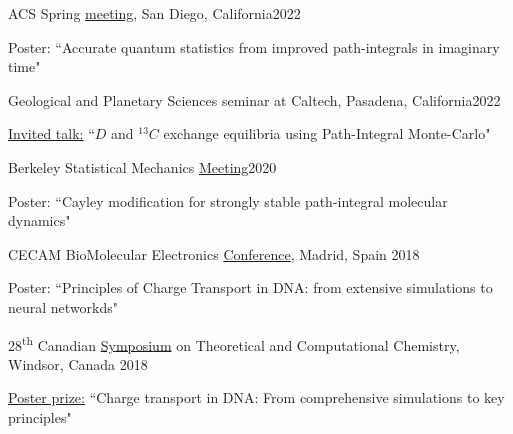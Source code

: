 \documentclass[margin,line]{res}
\newenvironment{list1}{
  \begin{list}{\ding{113}}{%
      \setlength{\itemsep}{0in}
      \setlength{\parsep}{0in} \setlength{\parskip}{0in}
      \setlength{\topsep}{0in} \setlength{\partopsep}{0in} 
      \setlength{\leftmargin}{0.17in}}}{\end{list}}
\begin{document}
\begin{resume}
ACS Spring \href{https://www.morressier.com/o/event/623377e0b300ee00119b311f}{meeting}, San Diego, California\hfill{2022}

\begin{list1}
\item[]Poster: ``Accurate quantum statistics from improved path-integrals in imaginary time"
\end{list1}

\vspace*{-2.5mm}

Geological and Planetary Sciences seminar at Caltech, Pasadena, California\hfill{2022}

\begin{list1}
\item[]\underline{Invited talk:} ``$D$ and $^{13}C$ exchange equilibria using Path-Integral Monte-Carlo"
\end{list1}

\vspace*{-2.5mm}

Berkeley Statistical Mechanics  \href{http://berkeleystatmech.org/}{Meeting}\hfill{2020}

\begin{list1}
\item[]Poster: ``Cayley modification for strongly stable path-integral molecular dynamics"
\end{list1}

\vspace*{-2.5mm}

CECAM BioMolecular Electronics \href{https://www.cecam.org/workshop-details/cecampsi-k-research-conference-biomolecular-electronics-biomolectro-246}{Conference}, Madrid, Spain \hfill {2018}

\begin{list1}
\item[]Poster: ``Principles of Charge Transport in DNA: from extensive simulations to neural networkds"
\end{list1}

\vspace*{-2.5mm}

28\textsuperscript{th} Canadian \href{http://catc.ca/cstcc2018}{Symposium} on Theoretical and Computational Chemistry, Windsor, Canada \hfill {2018}

\begin{list1}
\item[]\underline{Poster prize:} ``Charge transport in DNA: From comprehensive simulations to key principles"
\end{list1}


\end{resume}
\end{document}
